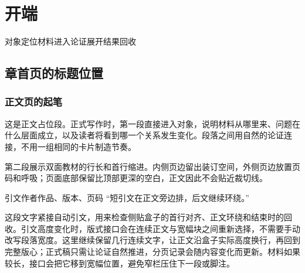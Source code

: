 \chapter{开端}
\begin{center}
  \small\color{bookgray}\mdiCompass\hspace{0.35em}对象定位\hspace{1em}\mdiDocument\hspace{0.35em}材料进入\hspace{1em}\mdiTimeline\hspace{0.35em}论证展开\hspace{1em}\mdiTarget\hspace{0.35em}结果回收
\end{center}

\section{章首页的标题位置}

\subsection{正文页的起笔}

这是正文占位段。正式写作时，第一段直接进入对象，说明材料从哪里来、问题在什么层面成立，以及读者将看到哪一个关系发生变化。段落之间用自然的论证连接，不用一组相同的卡片制造节奏。

第二段展示双面教材的行长和首行缩进。内侧页边留出装订空间，外侧页边放置页码和呼吸；页面底部保留比顶部更深的空白，正文因此不会贴近裁切线。

\begin{fullquote}{引文作者}{作品、版本、页码}
“短引文在正文旁边排，后文继续环绕。”
\end{fullquote}
这段文字紧接自动引文，用来检查侧贴盒子的首行对齐、正文环绕和结束时的回收。引文高度变化时，版式接口会在连续正文与宽幅块之间重新选择，不需要手动改写段落宽度。这里继续保留几行连续文字，让正文沿盒子实际高度换行，再回到完整版心；正式稿只需让论证自然推进，分页记录会随内容变化而更新。材料如果较长，接口会把它移到宽幅位置，避免窄栏压住下一段或脚注。
\bookwrapclear

